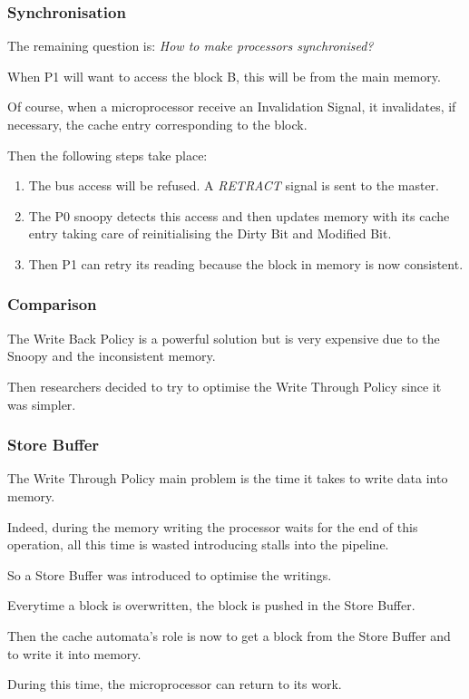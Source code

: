 \begin{frame}
  \frametitle{Synchronisation}

  The remaining question is: \textit{How to make processors synchronised?}

  \nl

  When P1 will want to access the block B, this will be from the main memory.

  \nl

  Of course, when a microprocessor receive an Invalidation Signal, it
  invalidates, if necessary, the cache entry corresponding to the block.

  \nl

  Then the following steps take place:

  \begin{enumerate}[<+->]
    \item
      The bus access will be refused. A \textit{RETRACT} signal is sent
      to the master.
    \item
      The P0 snoopy detects this access and then updates memory with
      its cache entry taking care of reinitialising the Dirty Bit and Modified
      Bit.
    \item
      Then P1 can retry its reading because the block in memory is now
      consistent.
  \end{enumerate}
\end{frame}


\begin{frame}
  \frametitle{Comparison}

  The Write Back Policy is a powerful solution but is very expensive
  due to the Snoopy and the inconsistent memory.

  \nl

  Then researchers decided to try to optimise the Write Through Policy
  since it was simpler.
\end{frame}


\begin{frame}
  \frametitle{Store Buffer}

  The Write Through Policy main problem is the time it takes to write
  data into memory.

  \nl

  Indeed, during the memory writing the processor waits for the end of this
  operation, all this time is wasted introducing stalls into the pipeline.

  \nl

  So a Store Buffer was introduced to optimise the writings.

  \nl

  Everytime a block is overwritten, the block is pushed in the Store Buffer.

  \nl

  Then the cache automata's role is now to get a block from the Store Buffer
  and to write it into memory.

  \nl

  During this time, the microprocessor can return to its work.
\end{frame}

